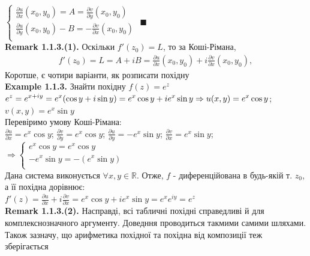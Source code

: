 \documentclass[a4paper, 14pt]{extarticle}
\def\hugespace{\vspace{5mm} \\}
\begin{document}
		$
	\begin{cases}
		\displaystyle\frac{\partial u}{\partial x}(x_0,y_0) = A = \frac{\partial v}{\partial y}(x_0,y_0)\\
		\displaystyle\frac{\partial u}{\partial y}(x_0,y_0) -B= -\frac{\partial v}{\partial x}(x_0,y_0)\\
	\end{cases}
	$
	$\blacksquare$
	\hugespace
	\textbf{Remark 1.1.3.(1).} Оскільки $f'(z_0)=L$, то за Коші-Рімана,
	\begin{align*}
	f'(z_0) = L = A+iB = \frac{\partial u}{\partial x}(x_0,y_0) + i\frac{\partial v}{\partial x}(x_0,y_0),
	\end{align*}
	Коротше, є чотири варіанти, як розписати похідну
	\hugespace
	
	\textbf{Example 1.1.3.} Знайти похідну $f(z)=e^z$\\
	$\displaystyle e^z=e^{x+iy}=e^x(\cos y+i \sin y)=e^x \cos y +i e^x \sin y
	\\ \Rightarrow u(x,y)=e^x \cos y$; $v(x,y) = e^x \sin y$\\
	Перевіримо умову Коші-Рімана:\\
	$\displaystyle\frac{\partial u}{\partial x}=e^x \cos y$; 
	$\displaystyle\frac{\partial v}{\partial y}=e^x \cos y$; 
	$\displaystyle\frac{\partial u}{\partial y}=-e^x \sin y$; 
	$\displaystyle\frac{\partial v}{\partial x}=e^x \sin y$;
	\\$\Rightarrow \begin{cases}
	\displaystyle e^x \cos y = e^x \cos y \\
	\displaystyle -e^x \sin y = -(e^x \sin y)\\
	\end{cases}$\\
	Дана система виконується $\forall x,y \in \mathbb{R}$. Отже, $f$ - диференційована в будь-якій т. $z_0$, а її похідна дорівнює:\\
	$\displaystyle f'(z)=\frac{\partial u}{\partial x} + i\frac{\partial v}{\partial x} = e^x \cos y + ie^x \sin y = e^x e^{iy} = e^z$
	\hugespace
	
	\textbf{Remark 1.1.3.(2).} Насправді, всі табличні похідні справедливі й для комплекснозначного аргументу. Доведння проводиться такмими самими шляхами.\\
	Також зазначу, що арифметика похідної та похідна від композиції теж зберігається
	\hugespace
	
\end{document}
